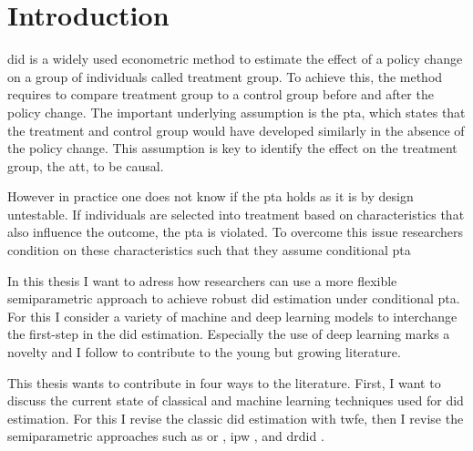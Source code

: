 \section{Introduction}




\ac{did} is a widely used econometric method to estimate the effect of a policy change on a group of individuals called treatment group.
To achieve this, the method requires to compare treatment group to a control group before and after the policy change.
The important underlying assumption is the \ac{pta}, which states that the treatment and control group would have developed similarly in the absence of the policy change.
This assumption is key to identify the effect on the treatment group, the \ac{att}, to be causal.

However in practice one does not know if the \ac{pta} holds as it is by design untestable.
If individuals are selected into treatment based on characteristics that also influence the outcome, the \ac{pta} is violated.
To overcome this issue researchers condition on these characteristics such that they assume conditional \ac{pta} \citep[see][]{santannaDoublyRobustDifferenceindifferences2020,manfeDifferenceInDifferenceDesignRepeated}

In this thesis I want to adress how researchers can use a more flexible semiparametric approach to achieve robust \ac{did} estimation under conditional \ac{pta}.
For this I consider a variety of machine and deep learning models to interchange the first-step in the \ac{did} estimation.
Especially the use of deep learning marks a novelty and I follow \citet{farrellDeepNeuralNetworks2021} to contribute to the young but growing literature.



%
This thesis wants to contribute in four ways to the literature.
First, I want to discuss the current state of classical and machine learning techniques used for \ac{did} estimation.
For this I revise the classic \ac{did} estimation with \ac{twfe}, then I revise the semiparametric approaches such as \ac{or} \citep[see][]{heckmanMatchingEconometricEvaluation1998}, \ac{ipw} \citep[see][]{abadieSemiparametricDifferenceinDifferencesEstimators2005}, and \ac{drdid} \citep[see][]{santannaDoublyRobustDifferenceindifferences2020}.

